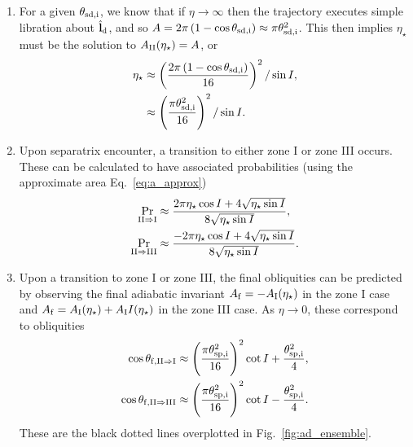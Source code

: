\documentclass[
        fleqn,
        usenatbib,
        referee,
    ]{mnras}
\newcommand*{\bm}[1]{\boldsymbol{\mathbf{#1}}}
\newcommand*{\uv}[1]{\hat{\bm{#1}}}
\newcommand*{\p}[1]{\left(#1\right)}
\begin{document}
\begin{enumerate}
    \item For a given $\theta_{\rm sd, i}$, we know that if $\eta \to \infty$
        then the trajectory executes simple libration about $\uv{l}_{\rm d}$,
        and so $A = 2\pi\p{1 - \cos \theta_{\rm sd, i}} \approx \pi \theta_{\rm
        sd, i}^2$. This then implies $\eta_\star$ must be the solution to
        $A_{\rm II}(\eta_\star) = A$, or
        \begin{align}
            \eta_\star &\approx \p{\frac{2\pi\p{1 - \cos \theta_{\rm sd,i}}}{
                        16}}^2 / \sin I,\\
                    &\approx \p{\frac{\pi \theta_{\rm sd, i}^2}{16}}^2/\sin I.
        \end{align}

    \item Upon separatrix encounter, a transition to either zone I or zone
        III occurs. These can be calculated to have associated probabilities
        (using the approximate area Eq.~\eqref{eq:a_approx})
        \begin{subequations}
            \begin{align}
                \Pr_{\rm II \Rightarrow I} &\approx \frac{2\pi
                    \eta_{\star} \cos I + 4\sqrt{\eta_{\star}\sin
                    I}}{8\sqrt{\eta_{\star}\sin I}},\\
                \Pr_{\rm II \Rightarrow III} &\approx \frac{-2\pi
                    \eta_{\star} \cos I + 4\sqrt{\eta_{\star}\sin
                    I}}{8\sqrt{\eta_{\star}\sin I}}.
            \end{align}
        \end{subequations}

    \item Upon a transition to zone I or zone III, the final obliquities can
        be predicted by observing the final adiabatic invariant $A_{\rm f} = -A_{\rm
        I}(\eta_\star)$ in the zone I case and $A_{\rm f} = A_{\rm I}(\eta_\star) +
        A_{\rm I}I(\eta_\star)$ in the zone III case. As $\eta \to 0$, these
        correspond to obliquities
        \begin{subequations}\label{se:q_f_approx}
            \begin{align}
                \cos \theta_{\rm f, II \Rightarrow I} &\approx
                    \p{\frac{\pi \theta_{\rm sp, i}^2}{16}}^2 \cot I
                        + \frac{\theta_{\rm sp, i}^2}{4},\\
                \cos \theta_{\rm f, II \Rightarrow III} &\approx
                    \p{\frac{\pi \theta_{\rm sp, i}^2}{16}}^2 \cot I
                        - \frac{\theta_{\rm sp, i}^2}{4}.
            \end{align}
        \end{subequations}
        These are the black dotted lines overplotted in
        Fig.~\ref{fig:ad_ensemble}.
\end{enumerate}
\end{document}
